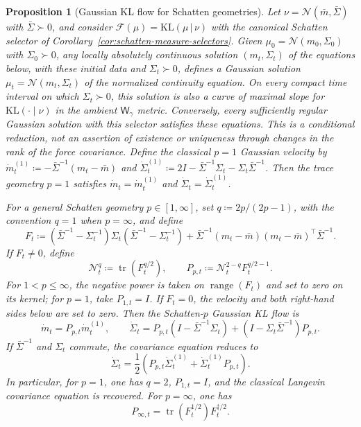 \documentclass{article}
\newtheorem{proposition}[theorem]{Proposition}
\newcommand{\Wg}{\mathsf{W}_{\gamma}}
\newcommand{\tr}{\operatorname{tr}}
\newcommand{\KL}{\mathrm{KL}}
\begin{document}
\begin{proposition}[Gaussian KL flow for Schatten geometries]
\label{prop:gaussian-kl-schatten-flow}
Let $\nu=\mathcal N(\bar m,\bar\Sigma)$ with $\bar\Sigma\succ0$, and consider
$\mathcal F(\mu)=\KL(\mu\,|\,\nu)$ with the canonical Schatten selector of
Corollary~\ref{cor:schatten-measure-selectors}. Given
$\mu_0=\mathcal N(m_0,\Sigma_0)$ with $\Sigma_0\succ0$, any locally absolutely
continuous solution $(m_t,\Sigma_t)$ of the equations below, with these initial
data and $\Sigma_t\succ0$, defines a Gaussian solution
$\mu_t=\mathcal N(m_t,\Sigma_t)$ of the normalized continuity equation.
On every compact time interval on which $\Sigma_t\succ0$, this solution is
also a curve of maximal slope for $\KL(\cdot\mid\nu)$ in the ambient
$\Wg$ metric.
Conversely, every sufficiently regular Gaussian solution with this selector
satisfies these equations. This is a conditional reduction, not an assertion
of existence or uniqueness through changes in the rank of the force covariance.
%
Define the classical $p=1$ Gaussian velocity by
$\dot m_t^{(1)}\coloneqq-\bar\Sigma^{-1}(m_t-\bar m)$ and
$\dot\Sigma_t^{(1)}\coloneqq
2I-\bar\Sigma^{-1}\Sigma_t-\Sigma_t\bar\Sigma^{-1}$.
Then the trace geometry $p=1$ satisfies
$\dot m_t=\dot m_t^{(1)}$ and $\dot\Sigma_t=\dot\Sigma_t^{(1)}$.

For a general Schatten geometry $p\in[1,\infty]$, set
$q\coloneqq 2p/(2p-1)$, with the convention $q=1$ when $p=\infty$, and define
\[
    F_t
    \coloneqq
    (\bar\Sigma^{-1}-\Sigma_t^{-1})\Sigma_t
    (\bar\Sigma^{-1}-\Sigma_t^{-1})
    +
    \bar\Sigma^{-1}(m_t-\bar m)(m_t-\bar m)^\top\bar\Sigma^{-1}.
\]
If $F_t\ne0$, define
\[
    \mathcal N_t^q\coloneqq \tr(F_t^{q/2}),
    \qquad
    P_{p,t}\coloneqq \mathcal N_t^{2-q}F_t^{q/2-1}.
\]
For $1<p\le\infty$, the negative power is taken on
$\operatorname{range}(F_t)$ and set to zero on its kernel; for $p=1$, take
$P_{1,t}=I$. If $F_t=0$, the velocity and both right-hand sides below are set
to zero. Then the Schatten-$p$ Gaussian KL flow is
\[
    \dot m_t=P_{p,t}\dot m_t^{(1)},
    \qquad
    \dot\Sigma_t
    =
    P_{p,t}(I-\bar\Sigma^{-1}\Sigma_t)
    +(I-\Sigma_t\bar\Sigma^{-1})P_{p,t}.
\]
If $\bar\Sigma^{-1}$ and $\Sigma_t$ commute, the covariance equation reduces
to
\[
 \dot\Sigma_t
 =\frac12\left(
   P_{p,t}\dot\Sigma_t^{(1)}
   +\dot\Sigma_t^{(1)}P_{p,t}
 \right).
\]
In particular, for $p=1$, one has $q=2$, $P_{1,t}=I$, and the classical
Langevin covariance equation is recovered. For $p=\infty$, one has
\[
    P_{\infty,t}=\tr(F_t^{1/2})F_t^{\dagger/2}.
\]
\end{proposition}
\end{document}
